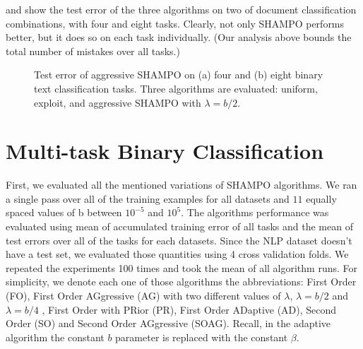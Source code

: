   and  show the test error of the three algorithms on two of document 
classification combinations, with four and eight tasks. Clearly, not only SHAMPO performs better, 
but it does so on each task individually. (Our analysis above bounds the total number of mistakes over all 
tasks.)
 
  \begin{figure}[h]
\begin{centering}
 \caption{
 Test error of aggressive SHAMPO on (a) four and (b) eight binary text classification tasks. 
 Three algorithms are evaluated: uniform, exploit, and aggressive SHAMPO with $\lambda=b/2$. }
\end{centering}
\end{figure}


\vspace{-0.1cm}
\section{Multi-task Binary Classification}
First, we evaluated all the mentioned variations of SHAMPO algorithms. We ran a 
single pass over all of the training examples for all datasets and $11$ equally spaced values of b 
between $10^{-5}$ and $10^5$. The algorithms performance was evaluated using 
mean of accumulated training error of all tasks and the mean of test errors over 
all of the tasks for each datasets. Since the NLP dataset doesn't have a test 
set, we evaluated those quantities using 4 cross validation folds. We repeated 
the experiments 100 times and took the mean of all algorithm runs.
For simplicity, we denote each one of those algorithms the  
abbreviations: First Order (FO), First Order AGgressive (AG) with two different values of $\lambda$, 
$\lambda = b/2$ and $\lambda = b/4$ , First Order with PRior (PR), First Order 
ADaptive (AD), Second Order (SO) and Second Order AGgressive (SOAG). 
Recall, in the adaptive algorithm the constant $b$ parameter is replaced with the constant 
$\beta$.

